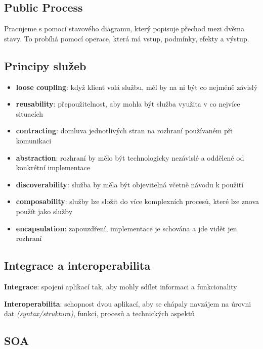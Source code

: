 \subsection{Public Process}

Pracujeme s pomocí stavového diagramu, který popisuje přechod mezi dvěma stavy. To probíhá pomocí operace, která má vstup, podmínky, efekty a výstup.

\subsection{Principy služeb}

\begin{itemize}
    \item \textbf{loose coupling}: když klient volá službu, měl by na ni být co nejméně závislý
    \item \textbf{reusability}: přepoužitelnost, aby mohla být služba využita v co nejvíce situacích
    \item \textbf{contracting}: domluva jednotlivých stran na rozhraní používaném při komunikaci
    \item \textbf{abstraction}: rozhraní by mělo být technologicky nezávislé a oddělené od konkrétní implementace
    \item \textbf{discoverability}: služba by měla být objevitelná včetně návodu k použití
    \item \textbf{composability}: služby lze složit do více komplexních procesů, které lze znova použít jako služby
    \item \textbf{encapsulation}: zapouzdření, implementace je schována a jde vidět jen rozhraní
\end{itemize}

\subsection{Integrace a interoperabilita}

\textbf{Integrace}: spojení aplikací tak, aby mohly sdílet informaci a funkcionality

\vspace{4pt}
\noindent \textbf{Interoperabilita}: schopnost dvou aplikací, aby se chápaly navzájem na úrovni dat \textit{(syntax/struktura)}, funkcí, procesů a technických aspektů

\subsection{SOA}

